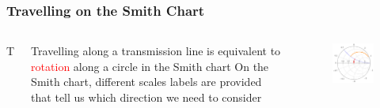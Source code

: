\documentclass[10pt, compress]{beamer}
\begin{document}
\begin{frame}
    \frametitle{Travelling on the Smith Chart}
    \begin{columns}{T}
        \begin{column}{.4\textwidth}
            \begin{outline}
                \1 Travelling along a transmission line is equivalent to \textcolor{red}{rotation} along a circle in the Smith chart
                \1 On the Smith chart, different scales labels are provided that tell us which direction we need to consider
            \end{outline}
        \end{column}


    \begin{column}[]{.6\textwidth}
        \begin{figure}[H]
            \centering
            \includegraphics[]{smith_example.pdf}

        \end{figure}
    \end{column}
\end{columns}
\end{frame}
\end{document}
